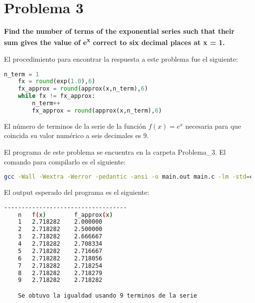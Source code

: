\section*{Problema 3}
\textbf{Find the number of terms of the exponential series such that their sum gives the value of e\textsuperscript{x} correct to six decimal places at x = 1.}

El procedimiento para encontrar la respuesta a este problema fue el siguiente:
\begin{lstlisting}[language=python]
    n_term = 1
    fx = round(exp(1.0),6)
    fx_approx = round(approx(x,n_term),6)
    while fx != fx_approx:
        n_term++
        fx_approx = round(approx(x,n_term),6)
\end{lstlisting}

El número de terminos de la serie de la función $f(x)=e^x$ necesaria para que coincida su valor numérico a seis decimales es 9.

El programa de este problema se encuentra en la carpeta \textcolor{citecolor}{Problema\_3}. El comando para compilarlo es el siguiente:

\begin{lstlisting}[language=bash]
    gcc -Wall -Wextra -Werror -pedantic -ansi -o main.out main.c -lm -std=c11
\end{lstlisting}

El output esperado del programa es el siguiente:
\begin{lstlisting}[language=bash]
    -----------------------------------
    n	f(x)		f_approx(x)
    1	2.718282	2.000000
    2	2.718282	2.500000
    3	2.718282	2.666667
    4	2.718282	2.708334
    5	2.718282	2.716667
    6	2.718282	2.718056
    7	2.718282	2.718254
    8	2.718282	2.718279
    9	2.718282	2.718282

    Se obtuvo la igualdad usando 9 terminos de la serie
\end{lstlisting}
